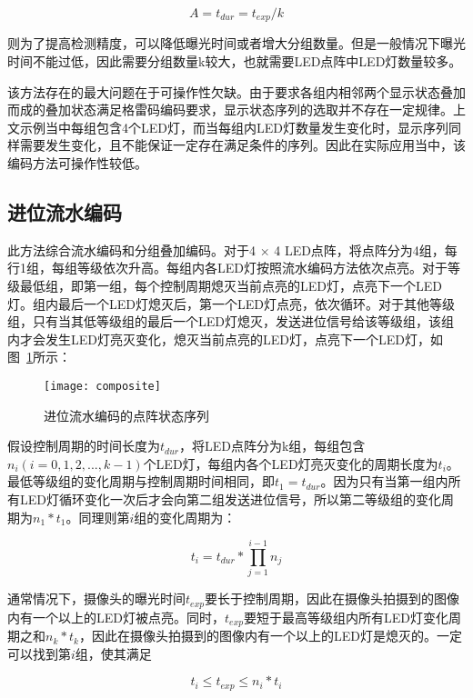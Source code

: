 \begin{equation}
A = t_{dur} = t_{exp} / k
\end{equation}

则为了提高检测精度，可以降低曝光时间或者增大分组数量。但是一般情况下曝光时间不能过低，因此需要分组数量k较大，也就需要LED点阵中LED灯数量较多。

该方法存在的最大问题在于可操作性欠缺。由于要求各组内相邻两个显示状态叠加而成的叠加状态满足格雷码编码要求，显示状态序列的选取并不存在一定规律。上文示例当中每组包含4个LED灯，而当每组内LED灯数量发生变化时，显示序列同样需要发生变化，且不能保证一定存在满足条件的序列。因此在实际应用当中，该编码方法可操作性较低。

\subsection{进位流水编码}

此方法综合流水编码和分组叠加编码。对于4 × 4 LED点阵，将点阵分为4组，每行1组，每组等级依次升高。每组内各LED灯按照流水编码方法依次点亮。对于等级最低组，即第一组，每个控制周期熄灭当前点亮的LED灯，点亮下一个LED灯。组内最后一个LED灯熄灭后，第一个LED灯点亮，依次循环。对于其他等级组，只有当其低等级组的最后一个LED灯熄灭，发送进位信号给该等级组，该组内才会发生LED灯亮灭变化，熄灭当前点亮的LED灯，点亮下一个LED灯，如图~\ref{composite}所示：

\begin{figure}[h] 
  \centering
  \texttt{[image: composite]}
  \caption{进位流水编码的点阵状态序列}
  \label{composite}
\end{figure}

假设控制周期的时间长度为$t_{dur}$，将LED点阵分为k组，每组包含$n_i(i = 0, 1, 2, ..., k-1)$个LED灯，每组内各个LED灯亮灭变化的周期长度为$t_i$。最低等级组的变化周期与控制周期时间相同，即$t_1 = t_{dur}$。因为只有当第一组内所有LED灯循环变化一次后才会向第二组发送进位信号，所以第二等级组的变化周期为$n_1 * t_1$。同理则第$i$组的变化周期为：

\begin{equation}
t_i = t_{dur} * \prod_{j=1}^{i-1} n_j
	\label{4}
\end{equation}

通常情况下，摄像头的曝光时间$t_{exp}$要长于控制周期，因此在摄像头拍摄到的图像内有一个以上的LED灯被点亮。同时，$t_{exp}$要短于最高等级组内所有LED灯变化周期之和$n_k * t_k$，因此在摄像头拍摄到的图像内有一个以上的LED灯是熄灭的。一定可以找到第$i$组，使其满足

\begin{equation}
t_i \le t_{exp} \le n_i * t_i
	\label{5}
\end{equation}

